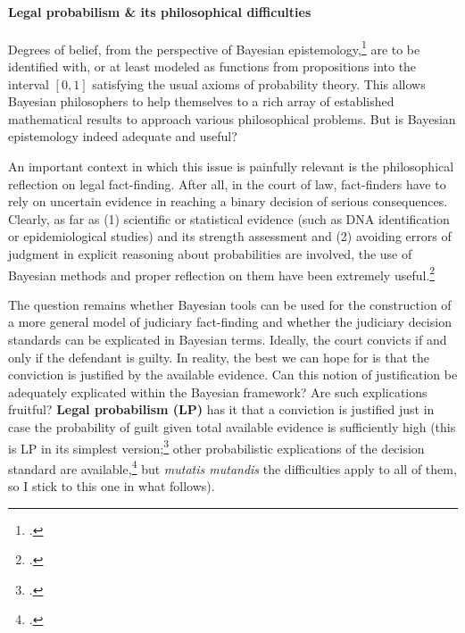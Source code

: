 \documentclass[11pt, a4paper]{article}
\begin{document}



\vspace{-5mm}


\paragraph{Legal probabilism \& its philosophical difficulties}


Degrees of belief, from the perspective of \linebreak Bayesian epistemology,\footcite{bovens2004bayesian,bradley2015critical}  are to be  identified with, or at least modeled as functions from propositions into the interval $[0,1]$ satisfying the usual axioms of probability theory. This allows Bayesian philosophers to help themselves to a rich array of established mathematical results to approach various philosophical problems.
But is Bayesian epistemology indeed adequate and useful? 


An important context in which this issue is painfully relevant is the philosophical reflection on legal fact-finding. After all, in the court of law, fact-finders have to rely on uncertain evidence in reaching a binary decision of serious consequences.  Clearly, as far as (1) scientific  or statistical evidence (such as DNA identification or epidemiological studies) and its strength assessment and (2) avoiding errors of judgment in explicit reasoning about probabilities are involved, the use of Bayesian me\-thods and proper reflection on them have been extremely useful.\footcite{aitken2004statistics,aitken2008fundamentals,finkelstein2009basic,robertson2016interpreting} 

The question remains  whether Bayesian tools can be used for the construction of a more general model of judiciary fact-finding and whether the judiciary decision standards can be explicated in Bayesian terms.   Ideally, the court convicts  if and only if  the defendant is guilty. In reality,  the best we can hope for is that the conviction is justified by the available evidence.  Can this notion of justification be adequately explicated within the Bayesian framework? Are such explications fruitful? \textbf{Legal probabilism (LP)}  has it that a conviction is justified just in case the probability of guilt given total available evidence is sufficiently high (this is LP in its simplest version;\footcite{Bernoulli1713Ars-conjectandi} other probabilistic explications of the decision standard are available,\footcite{cheng2012reconceptualizing,kaplow2014likelihood,Miller2018} but \emph{mutatis mutandis} the difficulties apply to all of them, so I stick to this one in what follows).
\end{document}
